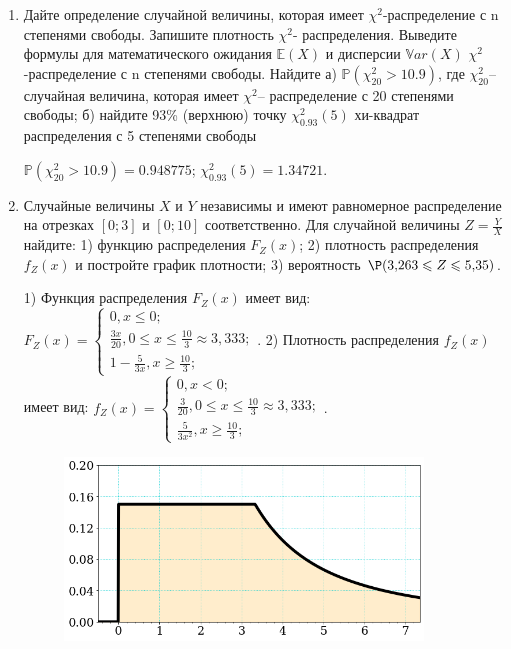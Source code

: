 \documentclass[a4paper,14pt]{article}
\begin{document}
\begin{enumerate}


\item


Дайте определение случайной величины, которая имеет $\chi ^{2}$-распределение с n степенями свободы.
Запишите плотность $\chi ^{2}$- распределения. Выведите формулы для математического ожидания $\mathbb{E}(X)$ и дисперсии $\mathbb{V}ar(X)$ $\chi ^{2}$-распределение с n степенями свободы. Найдите а) $\mathbb{P}(\chi _{20}^{2} > 10.9)$, где $\chi _{20}^{2}$–случайная величина, которая имеет $\chi ^{2}$– распределение с 20 степенями свободы; б) найдите 93\%
(верхнюю) точку $\chi _{0.93}^{2} (5)$ хи-квадрат распределения с 5 степенями свободы




$\mathbb{P}(\chi _{20}^{2} > 10.9) =  0.948775$; $\chi _{0.93}^{2} (5) = 1.34721$.


\item



Случайные величины $X$ и $Y$ независимы и имеют равномерное
распределение на отрезках $[0;3]$ и $[0;10]$ соответственно. Для случайной величины $Z=\frac{Y}{X}$ найдите: 
1) функцию распределения $F_Z(x)$;
2) плотность распределения $f_Z(x)$ и постройте график плотности;
3) вероятность $\P(3,\!263\leqslant Z\leqslant 5,\!35)$.




1) Функция распределения $F_Z(x)$ имеет вид:
$
F_Z(x)=\left\{
\begin{array}{l}
0, x\leqslant 0;\\
\frac{3 x}{20}, 0\leqslant x\leqslant \frac{10}{3}\approx 3,\!333;\\
1 - \frac{5}{3 x}, x\geqslant\frac{10}{3};
\end{array}.
\right.
$
2) Плотность распределения $f_Z(x)$ имеет вид:
$
f_Z(x)=\left\{
\begin{array}{l}
0, x<0;\\
\frac{3}{20}, 0\leqslant x\leqslant \frac{10}{3}\approx 3,\!333;\\
\frac{5}{3 x^{2}}, x\geqslant\frac{10}{3};
\end{array}.
\right.
$


\begin{figure}[H]
    \includegraphics[width=0.9\textwidth]{2_53d23}
\end{figure}



\end{enumerate}
\end{document}
